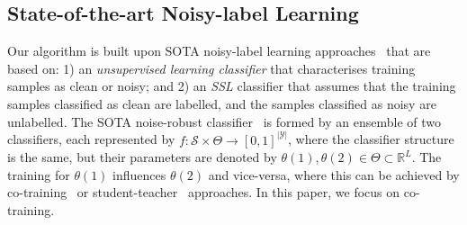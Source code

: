 \documentclass[review]{elsarticle}
\begin{document}
\subsection{State-of-the-art Noisy-label Learning}

Our algorithm is built upon SOTA noisy-label learning approaches~\cite{li2020dividemix, ding2018semi, kong2019recycling} that are based on: 1) an \textit{unsupervised learning classifier} that characterises training samples as clean or noisy; and 2) an \textit{SSL} classifier that assumes that the training samples classified as clean are labelled, and the samples classified as noisy are unlabelled.
The SOTA noise-robust classifier~\cite{li2020dividemix,nguyen2019self} is formed by an ensemble of two classifiers, each represented by $f:\mathcal{S} \times \Theta \rightarrow [0,1]^{|\mathcal{Y}|}$, where the classifier structure is the same, but their parameters are denoted by $\theta(1),\theta(2) \in \Theta \subset \mathbb{R}^L$.  The training for $\theta(1)$ influences $\theta(2)$ and vice-versa, where this can be achieved by co-training~\cite{li2020dividemix} or student-teacher~\cite{nguyen2019self} approaches. In this paper, we focus on co-training.
\end{document}

